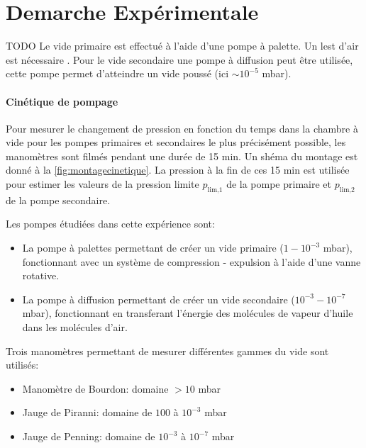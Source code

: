 \section{Demarche Expérimentale}

TODO
Le vide primaire est effectué à l'aide d'une pompe à palette. Un lest d'air est nécessaire . Pour le vide secondaire une pompe à diffusion peut être utilisée, cette pompe  permet d'atteindre un vide poussé (ici \(\sim 10^{-5}\) mbar).

\paragraph*{Cinétique de pompage}
Pour mesurer le changement de pression en fonction du temps dans la chambre à vide pour les pompes primaires et secondaires le plus précisément possible, les manomètres sont filmés pendant une durée de 15 \unit{\minute}. Un shéma du montage est donné à la \autoref{fig:montagecinetique}. La pression à la fin de ces 15 \unit{\minute} est utilisée pour estimer les valeurs de la pression limite \(p_\textrm{lim,1}\) de la pompe primaire et \(p_\textrm{lim,2}\) de la pompe secondaire.

Les pompes étudiées dans cette expérience sont:

\begin{itemize}
    \item La pompe à palettes permettant de créer un vide primaire (\(1 - 10^{-3}\) \unit{\milli\bar}), fonctionnant avec un système de compression - expulsion à l'aide d'une vanne rotative.
    \item La pompe à diffusion permettant de créer un vide secondaire (\(10^{-3} - 10^{-7}\) \unit{\milli\bar}), fonctionnant en transferant l'énergie des molécules de vapeur d'huile dans les molécules d'air.
\end{itemize}

Trois manomètres permettant de mesurer différentes gammes du vide sont utilisés:

\begin{itemize}
    \item Manomètre de Bourdon: domaine \(> 10\) \unit{\milli\bar}
    \item Jauge de Piranni: domaine de \(100\) à \(10^{-3}\) \unit{\milli\bar}
    \item Jauge de Penning: domaine de \(10^{-3}\) à \(10^{-7}\) \unit{\milli\bar}
\end{itemize}

